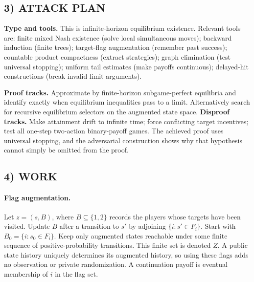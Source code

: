 \documentclass[11pt,a4paper]{article}
\theoremstyle{definition}
\theoremstyle{remark}
\begin{document}
\subsection*{3) ATTACK PLAN}
\textbf{Type and tools.} This is infinite-horizon equilibrium existence. Relevant tools are: finite mixed Nash existence (solve local simultaneous moves); backward induction (finite trees); target-flag augmentation (remember past success); countable product compactness (extract strategies); graph elimination (test universal stopping); uniform tail estimates (make payoffs continuous); delayed-hit constructions (break invalid limit arguments).

\textbf{Proof tracks.} Approximate by finite-horizon subgame-perfect equilibria and identify exactly when equilibrium inequalities pass to a limit. Alternatively search for recursive equilibrium selectors on the augmented state space. \textbf{Disproof tracks.} Make attainment drift to infinite time; force conflicting target incentives; test all one-step two-action binary-payoff games. The achieved proof uses universal stopping, and the adversarial construction shows why that hypothesis cannot simply be omitted from the proof.

\subsection*{4) WORK}
\paragraph{Flag augmentation.}
Let $z=(s,B)$, where $B\subseteq\{1,2\}$ records the players whose targets have been visited. Update $B$ after a transition to $s'$ by adjoining $\{i:s'\in F_i\}$. Start with $B_0=\{i:s_0\in F_i\}$. Keep only augmented states reachable under some finite sequence of positive-probability transitions. This finite set is denoted $Z$. A public state history uniquely determines its augmented history, so using these flags adds no observation or private randomization. A continuation payoff is eventual membership of $i$ in the flag set.
\end{document}
